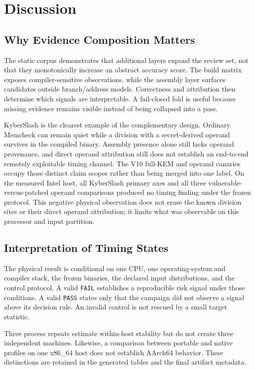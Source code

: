\documentclass[cryptography,article,submit,moreauthors]{Definitions/mdpi}
\begin{document}
\section{Discussion}
\label{sec:discussion}

\subsection{Why Evidence Composition Matters}

The static corpus demonstrates that additional layers expand the review set,
not that they monotonically increase an abstract accuracy score. The build
matrix exposes compiler-sensitive observations, while the assembly layer
surfaces candidates outside branch/address models. Correctness and attribution
then determine which signals are interpretable. A fail-closed fold is useful
because missing evidence remains visible instead of being collapsed into a
pass.

KyberSlash is the clearest example of the complementary design. Ordinary
Memcheck can remain quiet while a division with a secret-derived operand
survives in the compiled binary. Assembly presence alone still lacks operand
provenance, and direct operand attribution still does not establish an
end-to-end remotely exploitable timing channel. The V10 full-KEM and operand
canaries occupy those distinct claim scopes rather than being merged into one
label. On the measured Intel host, all KyberSlash primary axes and all three
vulnerable-versus-patched operand comparisons produced no timing finding under
the frozen protocol. This negative physical observation does not erase the
known division sites or their direct operand attribution; it limits what was
observable on this processor and input partition.

\subsection{Interpretation of Timing States}

The physical result is conditional on one CPU, one operating-system and
compiler stack, the frozen binaries, the declared input distributions, and the
control protocol. A valid \texttt{FAIL} establishes a reproducible risk signal
under those conditions. A valid \texttt{PASS} states only that the campaign did
not observe a signal above its decision rule. An invalid control is not rescued
by a small target statistic.

Three process repeats estimate within-host stability but do not create three
independent machines. Likewise, a comparison between portable and native
profiles on one x86\_64 host does not establish AArch64 behavior. These
distinctions are retained in the generated tables and the final artifact
metadata.
\end{document}
